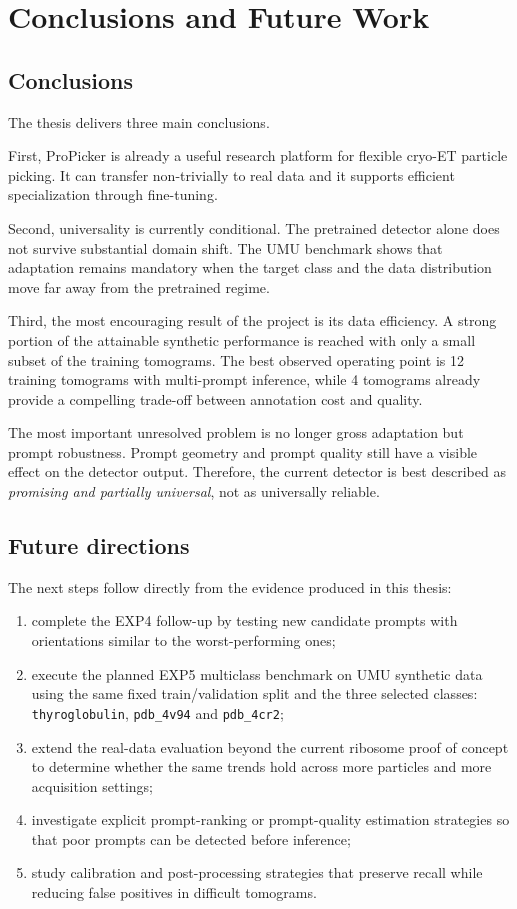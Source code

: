 \documentclass[12pt,a4paper]{report}
\begin{document}
\chapter{Conclusions and Future Work}

\section{Conclusions}
The thesis delivers three main conclusions.

First, ProPicker is already a useful research platform for flexible cryo-ET particle picking. It can transfer non-trivially to real data and it supports efficient specialization through fine-tuning.

Second, universality is currently conditional. The pretrained detector alone does not survive substantial domain shift. The UMU benchmark shows that adaptation remains mandatory when the target class and the data distribution move far away from the pretrained regime.

Third, the most encouraging result of the project is its data efficiency. A strong portion of the attainable synthetic performance is reached with only a small subset of the training tomograms. The best observed operating point is 12 training tomograms with multi-prompt inference, while 4 tomograms already provide a compelling trade-off between annotation cost and quality.

The most important unresolved problem is no longer gross adaptation but prompt robustness. Prompt geometry and prompt quality still have a visible effect on the detector output. Therefore, the current detector is best described as \emph{promising and partially universal}, not as universally reliable.

\section{Future directions}
The next steps follow directly from the evidence produced in this thesis:
\begin{enumerate}
  \item complete the EXP4 follow-up by testing new candidate prompts with orientations similar to the worst-performing ones;
  \item execute the planned EXP5 multiclass benchmark on UMU synthetic data using the same fixed train/validation split and the three selected classes: \texttt{thyroglobulin}, \texttt{pdb\_4v94} and \texttt{pdb\_4cr2};
  \item extend the real-data evaluation beyond the current ribosome proof of concept to determine whether the same trends hold across more particles and more acquisition settings;
  \item investigate explicit prompt-ranking or prompt-quality estimation strategies so that poor prompts can be detected before inference;
  \item study calibration and post-processing strategies that preserve recall while reducing false positives in difficult tomograms.
\end{enumerate}
\end{document}
